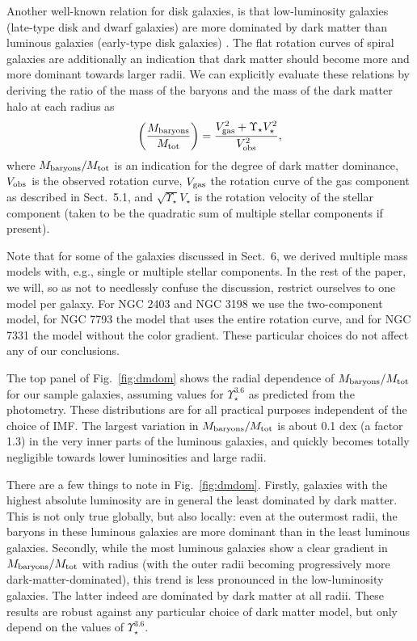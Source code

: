 \documentclass[usenatbib,usegraphicx,apjfonts,floatfix]{emulateapj}
\newcommand{\Ups}{\ensuremath{\Upsilon_{\star}^{3.6}}}
\begin{document}
Another well-known relation for disk galaxies, is that low-luminosity galaxies
(late-type disk and dwarf galaxies) are more dominated by dark matter
than luminous galaxies (early-type disk galaxies)
\citep[e.g.,][]{robertshaynes}. The flat rotation curves of spiral
galaxies are additionally an indication that dark matter should become
more and more dominant towards larger radii. We can explicitly evaluate
these relations by deriving the ratio of the mass of the baryons and
the mass of the dark matter halo at each radius as
\begin{equation}
  \left({{M_{\rm baryons}}\over{M_{\rm tot}}}\right) = {{V_{\rm gas}^2+\Upsilon_{\star}{V_{\star}^2}}\over{V_{\rm obs}^2}},
\end{equation}
where $M_{\rm baryons}/M_{\rm tot}$ is an indication for the degree
of dark matter dominance, $V_{\rm obs}$ is the observed rotation
curve, $V_{\rm gas}$ the rotation curve of the gas component as
described in Sect.\ 5.1, and $\sqrt{\Upsilon_{\star}}V_{\star}$ is the rotation velocity of
the stellar component (taken to be the quadratic sum of multiple
stellar components if present).

Note that for some of the galaxies discussed in Sect.~6, we derived
multiple mass models with, e.g., single or multiple stellar
components.  In the rest of the paper, we will, so as not to
needlessly confuse the discussion, restrict ourselves to one model per
galaxy.  For NGC 2403 and NGC 3198 we use the two-component model, for
NGC 7793 the model that uses the entire rotation curve, and for NGC
7331 the model without the color gradient. These particular choices do
not affect any of our conclusions.

The top panel of Fig.~\ref{fig:dmdom} shows the radial dependence of
$M_{\rm baryons}/{M_{\rm tot}}$ for our sample galaxies, assuming
values for $\Ups$ as predicted from the photometry.  These
distributions are for all practical purposes independent of the choice
of IMF.  The largest variation in $M_{\rm baryons}/M_{\rm tot}$ is
about 0.1 dex (a factor 1.3) in the very inner parts of the luminous galaxies, and
quickly becomes totally negligible towards lower luminosities and
large radii.

There are a few things to note in Fig.~\ref{fig:dmdom}. Firstly,
galaxies with the highest absolute luminosity are in general the least
dominated by dark matter. This is not only true globally, but also
locally: even at the outermost radii, the baryons in these luminous
galaxies are more dominant than in the least luminous
galaxies. Secondly, while the most luminous galaxies show a clear
gradient in $M_{\rm baryons}/{M_{\rm tot}}$ with radius (with the
outer radii becoming progressively more dark-matter-dominated), this
trend is less pronounced in the low-luminosity galaxies. The latter
indeed are dominated by dark matter at all radii.  These results are
robust against any particular choice of dark matter model, but only
depend on the values of \Ups.
\end{document}
